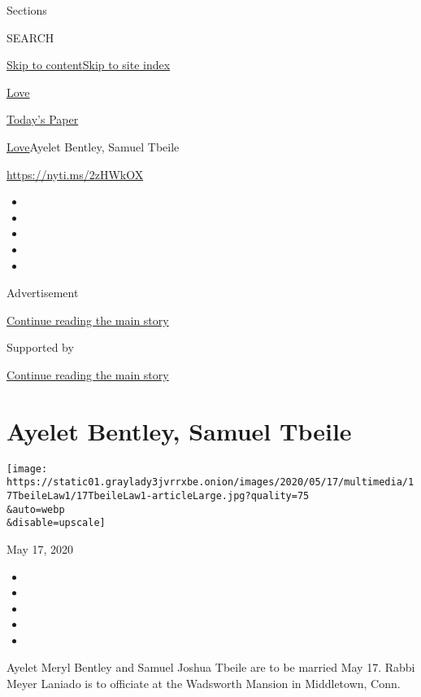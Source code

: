 Sections

SEARCH

\protect\hyperlink{site-content}{Skip to
content}\protect\hyperlink{site-index}{Skip to site index}

\href{https://www.nytimes3xbfgragh.onion/section/fashion/weddings}{Love}

\href{https://myaccount.nytimes3xbfgragh.onion/auth/login?response_type=cookie\&client_id=vi}{}

\href{https://www.nytimes3xbfgragh.onion/section/todayspaper}{Today's
Paper}

\href{/section/fashion/weddings}{Love}\textbar{}Ayelet Bentley, Samuel
Tbeile

\href{https://nyti.ms/2zHWkOX}{https://nyti.ms/2zHWkOX}

\begin{itemize}
\item
\item
\item
\item
\item
\end{itemize}

Advertisement

\protect\hyperlink{after-top}{Continue reading the main story}

Supported by

\protect\hyperlink{after-sponsor}{Continue reading the main story}

\hypertarget{ayelet-bentley-samuel-tbeile}{%
\section{Ayelet Bentley, Samuel
Tbeile}\label{ayelet-bentley-samuel-tbeile}}

\texttt{[image: https://static01.graylady3jvrrxbe.onion/images/2020/05/17/multimedia/17TbeileLaw1/17TbeileLaw1-articleLarge.jpg?quality=75\\\&auto=webp\\\&disable=upscale]}

May 17, 2020

\begin{itemize}
\item
\item
\item
\item
\item
\end{itemize}

Ayelet Meryl Bentley and Samuel Joshua Tbeile are to be married May 17.
Rabbi Meyer Laniado is to officiate at the Wadsworth Mansion in
Middletown, Conn.

